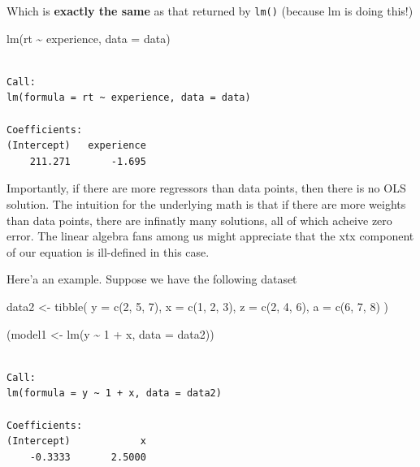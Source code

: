 \documentclass[
  letterpaper,
  DIV=11,
  numbers=noendperiod]{scrartcl}
\newenvironment{Shaded}{}{}
\newcommand{\AttributeTok}[1]{\textcolor[rgb]{0.84,0.23,0.29}{#1}}
\newcommand{\DecValTok}[1]{\textcolor[rgb]{0.00,0.36,0.77}{#1}}
\newcommand{\FunctionTok}[1]{\textcolor[rgb]{0.44,0.26,0.76}{#1}}
\newcommand{\NormalTok}[1]{\textcolor[rgb]{0.14,0.16,0.18}{#1}}
\newcommand{\OtherTok}[1]{\textcolor[rgb]{0.44,0.26,0.76}{#1}}
\newcommand{\SpecialCharTok}[1]{\textcolor[rgb]{0.00,0.36,0.77}{#1}}
\begin{document}
Which is \textbf{exactly the same} as that returned by \texttt{lm()}
(because lm is doing this!)

\begin{Shaded}
\begin{Highlighting}[]
\FunctionTok{lm}\NormalTok{(rt }\SpecialCharTok{\textasciitilde{}}\NormalTok{ experience, }\AttributeTok{data =}\NormalTok{ data)}
\end{Highlighting}
\end{Shaded}

\begin{verbatim}

Call:
lm(formula = rt ~ experience, data = data)

Coefficients:
(Intercept)   experience  
    211.271       -1.695  
\end{verbatim}

Importantly, if there are more regressors than data points, then there
is no OLS solution. The intuition for the underlying math is that if
there are more weights than data points, there are infinatly many
solutions, all of which acheive zero error. The linear algebra fans
among us might appreciate that the xtx component of our equation is
ill-defined in this case.

Here'a an example. Suppose we have the following dataset

\begin{Shaded}
\begin{Highlighting}[]
\NormalTok{data2 }\OtherTok{\textless{}{-}} \FunctionTok{tibble}\NormalTok{(}
    \AttributeTok{y =} \FunctionTok{c}\NormalTok{(}\DecValTok{2}\NormalTok{, }\DecValTok{5}\NormalTok{, }\DecValTok{7}\NormalTok{), }
    \AttributeTok{x =} \FunctionTok{c}\NormalTok{(}\DecValTok{1}\NormalTok{, }\DecValTok{2}\NormalTok{, }\DecValTok{3}\NormalTok{), }
    \AttributeTok{z =} \FunctionTok{c}\NormalTok{(}\DecValTok{2}\NormalTok{, }\DecValTok{4}\NormalTok{, }\DecValTok{6}\NormalTok{), }
    \AttributeTok{a =} \FunctionTok{c}\NormalTok{(}\DecValTok{6}\NormalTok{, }\DecValTok{7}\NormalTok{, }\DecValTok{8}\NormalTok{)}
\NormalTok{)}

\NormalTok{(model1 }\OtherTok{\textless{}{-}} \FunctionTok{lm}\NormalTok{(y }\SpecialCharTok{\textasciitilde{}} \DecValTok{1} \SpecialCharTok{+}\NormalTok{ x, }\AttributeTok{data =}\NormalTok{ data2))}
\end{Highlighting}
\end{Shaded}

\begin{verbatim}

Call:
lm(formula = y ~ 1 + x, data = data2)

Coefficients:
(Intercept)            x  
    -0.3333       2.5000  
\end{verbatim}
\end{document}
